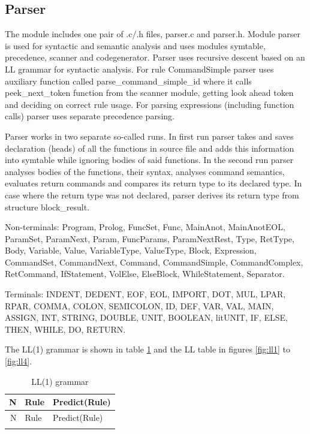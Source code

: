 \documentclass[a4paper,11pt]{article}
\begin{document}
\subsection{Parser}

The module includes one pair of .c/.h files, parser.c and parser.h.
Module parser is used for syntactic and semantic analysis and uses modules symtable,
precedence, scanner and codegenerator. Parser uses recursive descent based on an LL
grammar for syntactic analysis. For rule CommandSimple parser uses auxiliary function
called parse\_command\_simple\_id where it calls peek\_next\_token
function from the scanner module, getting look ahead token and deciding on correct rule
usage. For parsing expressions (including function calls) parser uses separate precedence
parsing.

Parser works in two separate so-called runs. In first run parser takes and saves
declaration (heads) of all the functions in source file and adds this information into
symtable while ignoring bodies of said functions. In the second run parser analyses bodies
of the functions, their syntax, analyses command semantics, evaluates return commands and
compares its return type to its declared type. In case where the return type was not
declared, parser derives its return type from structure block\_result.

Non-terminals: Program, Prolog, FuncSet, Func, MainAnot, MainAnotEOL, ParamSet, ParamNext,
Param, FuncParams, ParamNextRest, Type, RetType, Body, Variable, Value, VariableType,
ValueType, Block, Expression, CommandSet, CommandNext, Command, CommandSimple,
CommandComplex, RetCommand, IfStatement, VolElse, ElseBlock, WhileStatement, Separator.

Terminals: INDENT, DEDENT, EOF, EOL, IMPORT, DOT, MUL, LPAR, RPAR, COMMA, COLON,
SEMICOLON, ID, DEF, VAR, VAL, MAIN, ASSIGN, INT, STRING, DOUBLE, UNIT, BOOLEAN, litUNIT,
IF, ELSE, THEN, WHILE, DO, RETURN.

The LL(1) grammar is shown in table \ref{tab:grammar} and the LL table in figures
\ref{fig:ll1} to \ref{fig:ll4}.

{\small
\begin{longtable}{r p{} p{}}
  \caption{LL(1) grammar}\label{tab:grammar}\\
  \hline
  N & Rule & Predict(Rule) \\
  \hline
  \endfirsthead
  \hline
  N & Rule & Predict(Rule) \\
  \hline
  \endhead
  \hline
  \endfoot
  
\end{longtable}
}
\end{document}
